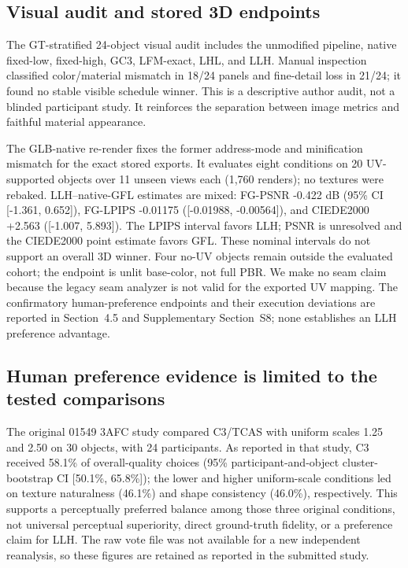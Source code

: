 \documentclass[times,twocolumn,final]{elsarticle}
\begin{document}
\subsection{Visual audit and stored 3D endpoints}

The GT-stratified 24-object visual audit includes the unmodified pipeline, native fixed-low, fixed-high, GC3, LFM-exact, LHL, and LLH. Manual inspection classified color/material mismatch in 18/24 panels and fine-detail loss in 21/24; it found no stable visible schedule winner. This is a descriptive author audit, not a blinded participant study. It reinforces the separation between image metrics and faithful material appearance.

The GLB-native re-render fixes the former address-mode and minification mismatch for the exact stored exports. It evaluates eight conditions on 20 UV-supported objects over 11 unseen views each (1,760 renders); no textures were rebaked. LLH--native-GFL estimates are mixed: FG-PSNR -0.422 dB (95\% CI [-1.361, 0.652]), FG-LPIPS -0.01175 ([-0.01988, -0.00564]), and CIEDE2000 \cite{sharma2005ciede} +2.563 ([-1.007, 5.893]). The LPIPS interval favors LLH; PSNR is unresolved and the CIEDE2000 point estimate favors GFL. These nominal intervals do not support an overall 3D winner. Four no-UV objects remain outside the evaluated cohort; the endpoint is unlit base-color, not full PBR. We make no seam claim because the legacy seam analyzer is not valid for the exported UV mapping. The confirmatory human-preference endpoints and their execution deviations are reported in Section~4.5 and Supplementary Section~S8; none establishes an LLH preference advantage.

\subsection{Human preference evidence is limited to the tested comparisons}
The original 01549 3AFC study compared C3/TCAS with uniform scales 1.25 and 2.50 on 30 objects, with 24 participants. As reported in that study, C3 received 58.1\% of overall-quality choices (95\% participant-and-object cluster-bootstrap CI [50.1\%, 65.8\%]); the lower and higher uniform-scale conditions led on texture naturalness (46.1\%) and shape consistency (46.0\%), respectively. This supports a perceptually preferred balance among those three original conditions, not universal perceptual superiority, direct ground-truth fidelity, or a preference claim for LLH. The raw vote file was not available for a new independent reanalysis, so these figures are retained as reported in the submitted study.
\end{document}
